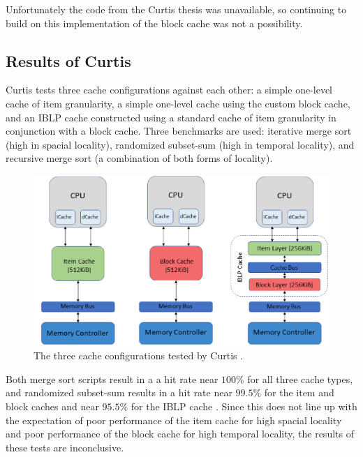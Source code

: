\documentclass[12pt,twoside]{reedthesis}
\begin{document}
	Unfortunately the code from the Curtis thesis was unavailable, so continuing to build on this implementation of the block cache was not a possibility.

	\subsection*{Results of Curtis}

	Curtis tests three cache configurations against each other: a simple one-level cache of item granularity, a simple one-level cache using the custom block cache, and an IBLP cache constructed using a standard cache of item granularity in conjunction with a block cache. Three benchmarks are used: iterative merge sort (high in spacial locality), randomized subset-sum (high in temporal locality), and recursive merge sort (a combination of both forms of locality).
	
	\begin{figure}[h]
		\centering
		\includegraphics[width=5in]{figures/curtis_caches.png}
		\caption{The three cache configurations tested by Curtis \cite{curtis}.}
	\end{figure}

	Both merge sort scripts result in a a hit rate near $100\%$ for all three cache types, and randomized subset-sum results in a hit rate near $99.5\%$ for the item and block caches and near $95.5\%$ for the IBLP cache \cite{curtis}. Since this does not line up with the expectation of poor performance of the item cache for high spacial locality and poor performance of the block cache for high temporal locality, the results of these tests are inconclusive.
\end{document}
